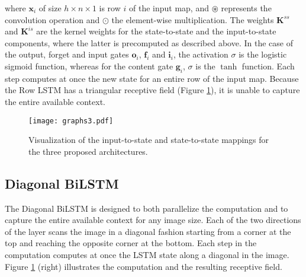 \documentclass{article}
\renewcommand{\vec}{\mathbf}
\begin{document}
where $\vec{x}_i$ of size $h \times n \times 1$ is row $i$ of the input map, and $\circledast$ represents the convolution operation and $\odot$ the element-wise multiplication. The weights $\vec{K}^{ss}$ and $\vec{K}^{is}$ are the kernel weights for the state-to-state and the input-to-state components, where the latter is precomputed as described above. In the case of the output, forget and input gates $\vec{o}_i$, $\vec{f}_i$ and $\vec{i}_i$, the activation $\sigma$ is the logistic sigmoid function, whereas for the content gate $\vec{g}_i$, $\sigma$ is the $\tanh$ function. Each step computes at once the new state for an entire row of the input map. Because the Row LSTM has a triangular receptive field (Figure \ref{mappings}), it is unable to capture the entire available context.

\begin{figure}[ht]
\texttt{[image: graphs3.pdf]}
\vspace{-0.7cm}
\caption{Visualization of the input-to-state and state-to-state mappings for the three proposed architectures.}
\label{mappings}
\vspace{-0.2cm}
\end{figure}

\subsection{Diagonal BiLSTM}
\label{sect:diag_lstm}

The Diagonal BiLSTM is designed to both parallelize the computation and to capture the entire available context for any image size. Each of the two directions of the layer scans the image in a diagonal fashion starting from a corner at the top and reaching the opposite corner at the bottom. Each step in the computation computes at once the LSTM state along a diagonal in the image. Figure \ref{mappings} (right) illustrates the computation and the resulting receptive field.
\end{document}
